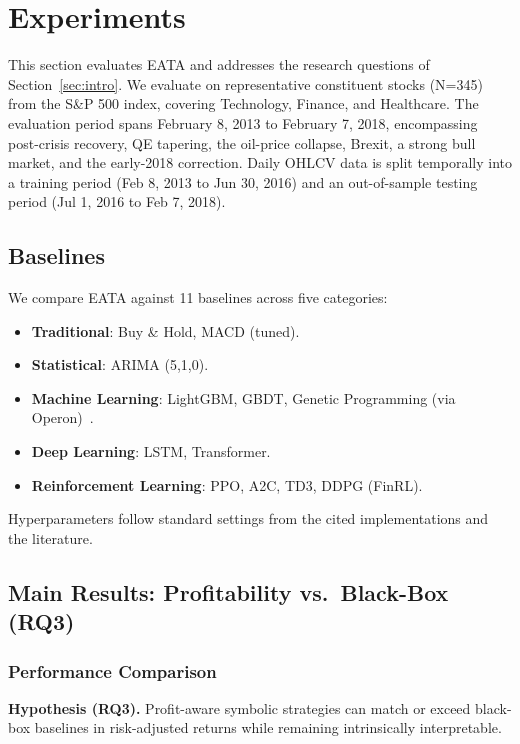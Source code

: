 \section{Experiments}
\label{sec:experiments}

This section evaluates EATA and addresses the research questions of Section~\ref{sec:intro}. We evaluate on representative constituent stocks (N=345) from the S\&P 500 index, covering Technology, Finance, and Healthcare. The evaluation period spans February 8, 2013 to February 7, 2018, encompassing post-crisis recovery, QE tapering, the oil-price collapse, Brexit, a strong bull market, and the early-2018 correction. Daily OHLCV data is split temporally into a training period (Feb 8, 2013 to Jun 30, 2016) and an out-of-sample testing period (Jul 1, 2016 to Feb 7, 2018).

\subsection{Baselines}
We compare EATA against 11 baselines across five categories:
\begin{itemize}
    \item \textbf{Traditional}: Buy \& Hold, MACD (tuned).
    \item \textbf{Statistical}: ARIMA (5,1,0).
    \item \textbf{Machine Learning}: LightGBM, GBDT, Genetic Programming (via Operon)~\cite{burlacu2020operon}.
    \item \textbf{Deep Learning}: LSTM, Transformer.
    \item \textbf{Reinforcement Learning}: PPO, A2C, TD3, DDPG (FinRL).
\end{itemize}
Hyperparameters follow standard settings from the cited implementations and the literature.

\subsection{Main Results: Profitability vs.\ Black-Box (RQ3)}

\subsubsection{Performance Comparison}
\textbf{Hypothesis (RQ3).} Profit-aware symbolic strategies can match or exceed black-box baselines in risk-adjusted returns while remaining intrinsically interpretable.

